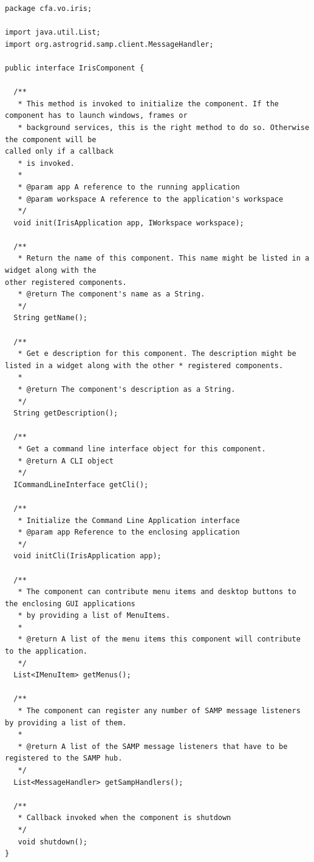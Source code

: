 \documentclass[final,5p,authoryear]{elsarticle}
\begin{document}
\begin{lstlisting}[style=java,
	caption={This snippet of code represents the main interface that all components in Iris have to implement, and how dependencies get injected into the components at run-time.}, 		
	label=lst:component]
package cfa.vo.iris;

import java.util.List;
import org.astrogrid.samp.client.MessageHandler;

public interface IrisComponent {

  /**
   * This method is invoked to initialize the component. If the component has to launch windows, frames or
   * background services, this is the right method to do so. Otherwise the component will be
called only if a callback
   * is invoked.
   * 
   * @param app A reference to the running application
   * @param workspace A reference to the application's workspace
   */
  void init(IrisApplication app, IWorkspace workspace);

  /**
   * Return the name of this component. This name might be listed in a widget along with the
other registered components.
   * @return The component's name as a String. 
   */
  String getName();

  /**
   * Get e description for this component. The description might be listed in a widget along with the other * registered components.
   *
   * @return The component's description as a String.
   */
  String getDescription();

  /**
   * Get a command line interface object for this component.
   * @return A CLI object
   */
  ICommandLineInterface getCli();

  /**
   * Initialize the Command Line Application interface
   * @param app Reference to the enclosing application
   */
  void initCli(IrisApplication app);

  /**
   * The component can contribute menu items and desktop buttons to the enclosing GUI applications
   * by providing a list of MenuItems.
   *
   * @return A list of the menu items this component will contribute to the application. 
   */
  List<IMenuItem> getMenus();

  /**
   * The component can register any number of SAMP message listeners by providing a list of them.
   *
   * @return A list of the SAMP message listeners that have to be registered to the SAMP hub. 
   */
  List<MessageHandler> getSampHandlers();

  /**
   * Callback invoked when the component is shutdown
   */
   void shutdown();
}
\end{lstlisting}
\end{document}
